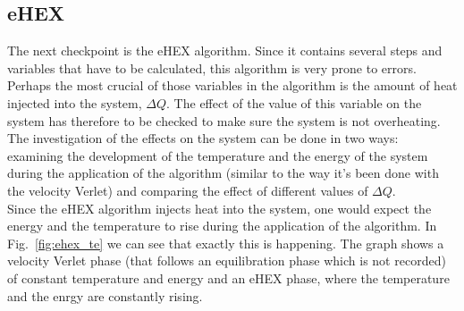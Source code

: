 \documentclass[12pt]{article}
\begin{document}
\subsection{eHEX}
The next checkpoint is the eHEX algorithm. Since it contains several steps and variables that have to be calculated, this algorithm is very prone
to errors. Perhaps the most crucial of those variables in the algorithm is the amount of heat injected into the system, $\Delta Q$. 
The effect of the value of this variable on the system has therefore to be checked to make sure the system is not overheating.\\
The investigation of the effects on the system can be done in two ways: examining the development of the temperature and the energy of the system 
during the 
application of the algorithm (similar to the way it's been done with the velocity Verlet) and comparing the effect of different values of $\Delta Q$.\\
Since the eHEX algorithm injects heat into the system, one would expect the energy and the temperature to rise during the application of the
algorithm. In Fig.~\ref{fig:ehex_te} we can see that exactly this is happening. The graph shows a velocity Verlet phase (that follows an equilibration
phase which is not recorded) of constant temperature and energy and an eHEX phase, where the temperature and the enrgy are constantly rising. 
\end{document}
